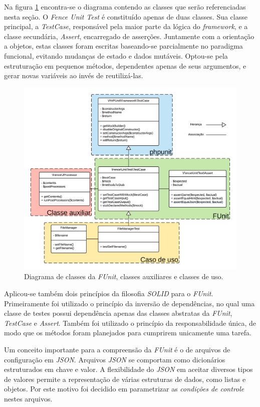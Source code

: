 Na figura \ref{fig:funit-class-diagram} encontra-se o diagrama contendo as classes que serão referenciadas nesta seção. O \emph{Fence Unit Test} é constituído apenas de duas classes. Sua classe principal, a \emph{TestCase}, responsável pela maior parte da lógica do \emph{framework}, e a classe secundária, \emph{Assert}, encarregado de asserções. Juntamente com a orientação a objetos, estas classes foram escritas baseando-se parcialmente no paradigma funcional, evitando mudanças de estado e dados mutáveis. Optou-se pela estruturação em pequenos métodos, dependentes apenas de seus argumentos, e gerar novas variáveis ao invés de reutilizá-las.

\begin{figure}[H]
    \centering
    \includegraphics[width=15cm]{source/4-solucao/images/funit-class-diagram.png}
    \caption{Diagrama de classes da \emph{FUnit}, classes auxiliares e classes de uso.}
    \label{fig:funit-class-diagram}
\end{figure}

Aplicou-se também dois princípios da filosofia \emph{SOLID} para o \emph{FUnit}. Primeiramente foi utilizado o princípio da inversão de dependências, no qual uma classe de testes possui dependência apenas das classes abstratas da \emph{FUnit}, \emph{TestCase} e \emph{Assert}. Também foi utilizado o princípio da responsabilidade única, de modo que os métodos foram planejados para cumprirem unicamente uma tarefa.

Um conceito importante para a compreensão da \emph{FUnit} é o de arquivos de configuração em \emph{JSON}. Arquivos \emph{JSON} se comportam como dicionários estruturados em chave e valor. A flexibilidade do \emph{JSON} em aceitar diversos tipos de valores permite a representação de várias estruturas de dados, como listas e objetos. Por este motivo foi decidido em parametrizar as \emph{condições de controle} nestes arquivos.

